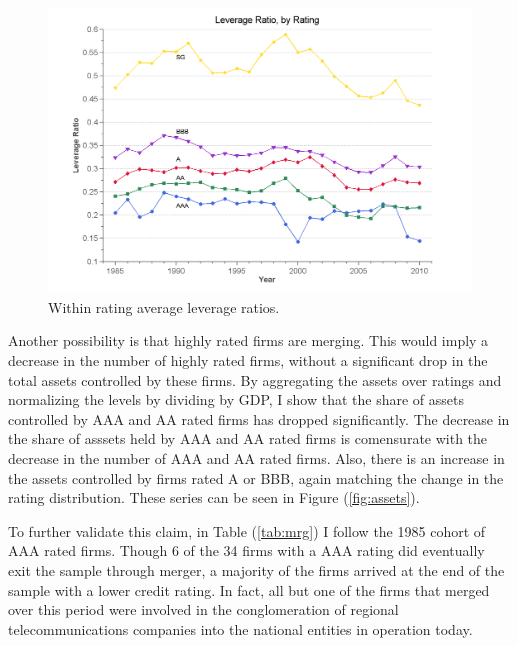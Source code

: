 \documentclass[notitlepage]{article}
\begin{document}
\begin{figure}[ht]
\centering
	\includegraphics[width=\textwidth]{lev_ratios_avg.png}
	\caption{Within rating average leverage ratios.}
	\label{fig:avg_lev}
\end{figure}

Another possibility is that highly rated firms are merging. This would imply a decrease in the number of highly rated firms, without a significant drop in the total assets controlled by these firms. By aggregating the assets over ratings and normalizing the levels by dividing by GDP, I show that the share of assets controlled by AAA and AA rated firms has dropped significantly. The decrease in the share of asssets held by AAA and AA rated firms is comensurate with the decrease in the number of AAA and AA rated firms. Also, there is an increase in the assets controlled by firms rated A or BBB, again matching the change in the rating distribution. These series can be seen in Figure (\ref{fig:assets}). 

To further validate this claim, in Table (\ref{tab:mrg}) I follow the 1985 cohort of AAA rated firms. Though 6 of the 34 firms with a AAA rating did eventually exit the sample through merger, a majority of the firms arrived at the end of the sample with a lower credit rating. In fact, all but one of the firms that merged over this period were involved in the conglomeration of regional telecommunications companies into the national entities in operation today.
\end{document}
